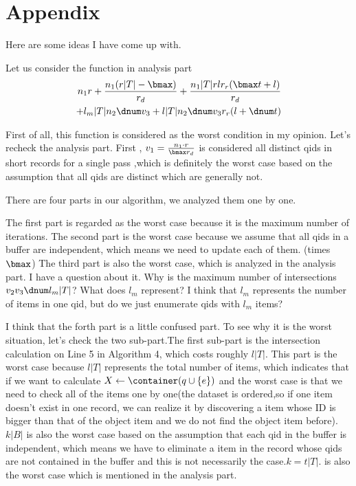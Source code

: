 
 \section{Appendix}
\label{sec:appendix}

Here are some ideas I have come up with.

Let us consider the function in analysis part
\begin{align*}
  n_1 r
+ \frac{n_1 (r |T| - \bmax)}{r_d}
+ \frac{n_1 |T| r l r_r (\bmax t + l)}{r_d} \\
+ l_m |T| n_2 \dnum v_3
+ l |T| n_2 \dnum v_3 r_r (l + \dnum t)
\end{align*}

First of all, this function is considered as the worst condition in my opinion.
Let's recheck the analysis part.
First ,  $v_1=\frac{n_1\cdot r}{\bmax r_d}$ is  considered all distinct qids
in short records for a single pass ,which is definitely the worst case based on the assumption that
all qids are distinct which are generally not.

There are four parts in our algorithm, we analyzed them one by one.

The first part is regarded as the worst case because it is  the maximum number of iterations.
The second part is the worst case because we assume that all qids in a buffer are independent, which
means we need to update each of them. (times $\bmax$)
The third part is also the worst case, which is analyzed in the analysis part. I have a question about it.
Why is the maximum number of intersections  $v_2 v_3 \dnum l_m |T|$? What does $l_m$ represent?
I think that $l_m$ represents the number of items in one qid, but do we just enumerate qids with 
$l_m$ items?


I think that the forth part is a little confused part. To see why it is the worst situation, let's check the 
two sub-part.The first sub-part is the intersection calculation on Line 5 in Algorithm 4,
which costs roughly $l |T|$. This part is the worst case because $l |T|$ represents the total number of items,
which indicates that if we want to calculate $X \leftarrow \container(q\cup\{e\})$ and the worst case is that 
we need to check all of the items one by one(the dataset is ordered,so if one item doesn't exist in one record,
we can realize it by discovering a item whose ID is bigger than that of the  object item and we do not find 
the object item before).  $k |B|$ is also the worst case based on the assumption that
each qid in the buffer is independent, which means we have to eliminate a item in the record whose qids are not 
contained in the buffer and this is not necessarily the case.$k= t |T|$. is also the worst case which is mentioned 
in the analysis part.


